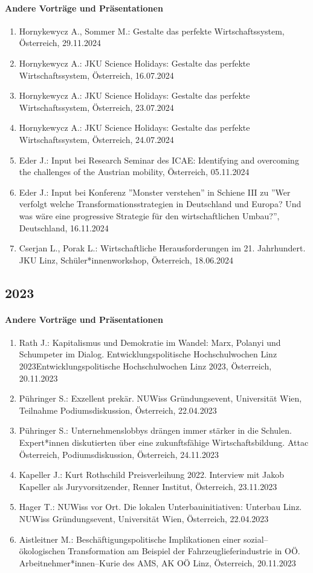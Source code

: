 \paragraph{Andere Vorträge und Präsentationen}
\begin{enumerate}
	\item Hornykewycz A., Sommer M.: Gestalte das perfekte Wirtschaftssystem, Österreich, 29.11.2024
	\item Hornykewycz A.: JKU Science Holidays: Gestalte das perfekte Wirtschaftssystem, Österreich, 16.07.2024
	\item Hornykewycz A.: JKU Science Holidays: Gestalte das perfekte Wirtschaftssystem, Österreich, 23.07.2024
	\item Hornykewycz A.: JKU Science Holidays: Gestalte das perfekte Wirtschaftssystem, Österreich, 24.07.2024
	\item Eder J.: Input bei Research Seminar des ICAE: Identifying and overcoming the challenges of the Austrian mobility, Österreich, 05.11.2024
	\item Eder J.: Input bei Konferenz ''Monster verstehen'' in Schiene III zu ''Wer verfolgt welche Transformationsstrategien in Deutschland und Europa? Und was wäre eine progressive Strategie für den wirtschaftlichen Umbau?'', Deutschland, 16.11.2024
	\item Cserjan L., Porak L.: Wirtschaftliche Herausforderungen im 21. Jahrhundert. JKU Linz, Schüler*innenworkshop, Österreich, 18.06.2024
\end{enumerate}
\subsection*{2023}
\paragraph{Andere Vorträge und Präsentationen}
\begin{enumerate}
	\item Rath J.: Kapitalismus und Demokratie im Wandel: Marx, Polanyi und Schumpeter im Dialog. Entwicklungspolitische Hochschulwochen Linz 2023Entwicklungspolitische Hochschulwochen Linz 2023, Österreich, 20.11.2023
	\item Pühringer S.: Exzellent prekär. NUWiss Gründungsevent, Universität Wien, Teilnahme Podiumsdiskussion, Österreich, 22.04.2023
	\item Pühringer S.: Unternehmenslobbys drängen immer stärker in die Schulen. Expert*innen diskutierten über eine zukunftsfähige Wirtschaftsbildung. Attac Österreich, Podiumsdiskussion, Österreich, 24.11.2023
	\item Kapeller J.: Kurt Rothschild Preisverleihung 2022. Interview mit Jakob Kapeller als Juryvorsitzender, Renner Institut, Österreich, 23.11.2023
	\item Hager T.: NUWiss vor Ort. Die lokalen Unterbauinitiativen: Unterbau Linz. NUWiss Gründungsevent, Universität Wien, Österreich, 22.04.2023
	\item Aistleitner M.: Beschäftigungspolitische Implikationen einer sozial--ökologischen Transformation am Beispiel der Fahrzeuglieferindustrie in OÖ. Arbeitnehmer*innen--Kurie des AMS, AK OÖ Linz, Österreich, 20.11.2023
\end{enumerate}
